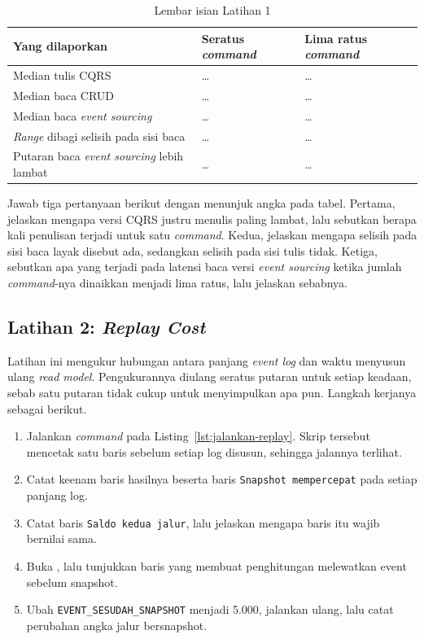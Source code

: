 \begin{table}[htbp]
  \centering
  \caption{Lembar isian Latihan 1}
  \label{tab:lat1cqrs-hasil}
  \begin{tabularx}{\textwidth}{|X|l|l|}
    \hline
    \textbf{Yang dilaporkan} & \textbf{Seratus \textit{command}} & \textbf{Lima ratus \textit{command}} \\
    \hline
    Median tulis CQRS & \dots & \dots \\
    \hline
    Median baca CRUD & \dots & \dots \\
    \hline
    Median baca \textit{event sourcing} & \dots & \dots \\
    \hline
    \textit{Range} dibagi selisih pada sisi baca & \dots & \dots \\
    \hline
    Putaran baca \textit{event sourcing} lebih lambat & \dots & \dots \\
    \hline
  \end{tabularx}
\end{table}

Jawab tiga pertanyaan berikut dengan menunjuk angka pada tabel. Pertama,
jelaskan mengapa versi CQRS justru menulis paling lambat, lalu sebutkan berapa
kali penulisan terjadi untuk satu \textit{command}. Kedua, jelaskan mengapa selisih
pada sisi baca layak disebut ada, sedangkan selisih pada sisi tulis tidak.
Ketiga, sebutkan apa yang terjadi pada latensi baca versi \textit{event
sourcing} ketika jumlah \textit{command}-nya dinaikkan menjadi lima ratus, lalu
jelaskan sebabnya.

\subsection*{Latihan 2: \textit{Replay Cost}}

Latihan ini mengukur hubungan antara panjang \textit{event log} dan waktu menyusun
ulang \textit{read model}. Pengukurannya diulang seratus putaran untuk setiap keadaan,
sebab satu putaran tidak cukup untuk menyimpulkan apa pun. Langkah kerjanya
sebagai berikut.

\begin{enumerate}
  \item Jalankan \textit{command} pada Listing~\ref{lst:jalankan-replay}. Skrip
    tersebut mencetak satu baris sebelum setiap log disusun, sehingga jalannya
    terlihat.
  \item Catat keenam baris hasilnya beserta baris \texttt{Snapshot
    mempercepat} pada setiap panjang log.
  \item Catat baris \texttt{Saldo kedua jalur}, lalu jelaskan mengapa baris itu
    wajib bernilai sama.
  \item Buka , lalu tunjukkan baris
    yang membuat penghitungan melewatkan event sebelum snapshot.
  \item Ubah \texttt{EVENT\_SESUDAH\_SNAPSHOT} menjadi 5.000, jalankan
    ulang, lalu catat perubahan angka jalur bersnapshot.
\end{enumerate}

